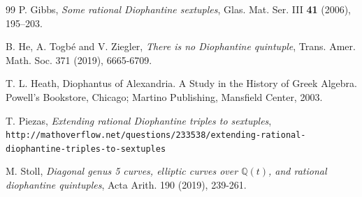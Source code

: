 \documentclass[a4paper]{amsart}
\theoremstyle{plain}
\theoremstyle{definition}
\begin{document}
\begin{thebibliography}{99}
P. Gibbs,
{\it Some rational Diophantine sextuples}, Glas. Mat. Ser. III {\bf 41} (2006), 195--203.

B. He, A. Togb\'e and V. Ziegler,
{\it There is no Diophantine quintuple}, Trans. Amer. Math. Soc. 371 (2019), 6665-6709.

T. L. Heath, Diophantus of Alexandria. A Study in the History of Greek Algebra. Powell's Bookstore, Chicago; Martino Publishing, Mansfield Center, 2003.


T. Piezas,
{\it Extending rational Diophantine triples to sextuples}, \\
{\tt http://mathoverflow.net/questions/233538/extending-rational-diophantine-triples-to-sextuples}

M. Stoll, {\it Diagonal genus 5 curves, elliptic curves over $\mathbb{Q}(t)$, and rational diophantine quintuples}, Acta Arith. 190 (2019), 239-261.



\end{thebibliography}
\end{document}
